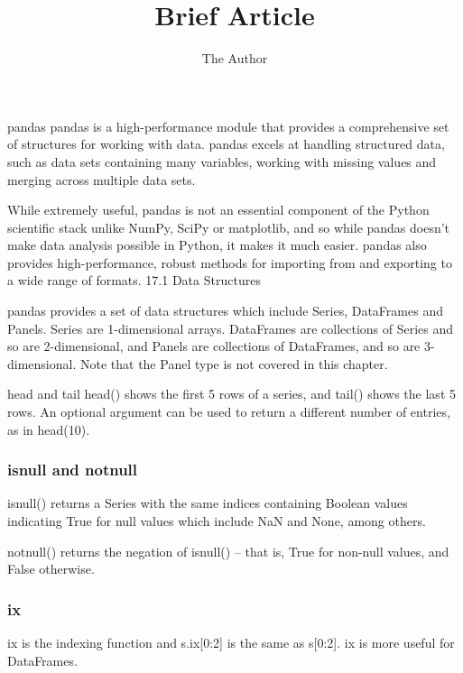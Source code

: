 \documentclass[11pt]{article} %
\title{Brief Article}
\author{The Author}
\begin{document}
pandas
pandas is a high-performance module that provides a comprehensive set of structures for working with
data. pandas excels at handling structured data, such as data sets containing many variables, working with
missing values and merging across multiple data sets. 

While extremely useful, pandas is not an essential component of the Python scientific stack unlike NumPy, SciPy or matplotlib, and so while pandas doesn’t
make data analysis possible in Python, it makes it much easier. pandas also provides high-performance,
robust methods for importing from and exporting to a wide range of formats.
17.1 Data Structures

pandas provides a set of data structures which include Series, DataFrames and Panels. Series are 1-dimensional
arrays. DataFrames are collections of Series and so are 2-dimensional, and Panels are collections of DataFrames,
and so are 3-dimensional. Note that the Panel type is not covered in this chapter.

head and tail
head() shows the first 5 rows of a series, and tail() shows the last 5 rows. An optional argument can be
used to return a different number of entries, as in head(10).
\subsubsection{isnull and notnull}

isnull() returns a Series with the same indices containing Boolean values indicating True for null values
which include NaN and None, among others. 

notnull() returns the negation of isnull() – that is, True for
non-null values, and False otherwise.
\subsubsection{ix}
ix is the indexing function and s.ix[0:2] is the same as s[0:2]. ix is more useful for DataFrames.

\end{document}

